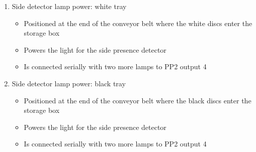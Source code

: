 \documentclass[a4paper,oneside,11pt]{report}
\begin{document}
\begin{enumerate}
\begin{itemize}
\end{itemize}
\item Side detector lamp power: white tray
\begin{itemize}
\item Positioned at the end of the conveyor belt where the white discs enter the storage box
\item Powers the light for the side presence detector
\item Is connected serially with two more lamps to PP2 output 4
\end{itemize}
\item Side detector lamp power: black tray
\begin{itemize}
\item Positioned at the end of the conveyor belt where the black discs enter the storage box
\item Powers the light for the side presence detector
\item Is connected serially with two more lamps to PP2 output 4
\end{itemize}
\end{enumerate}
\end{document}
